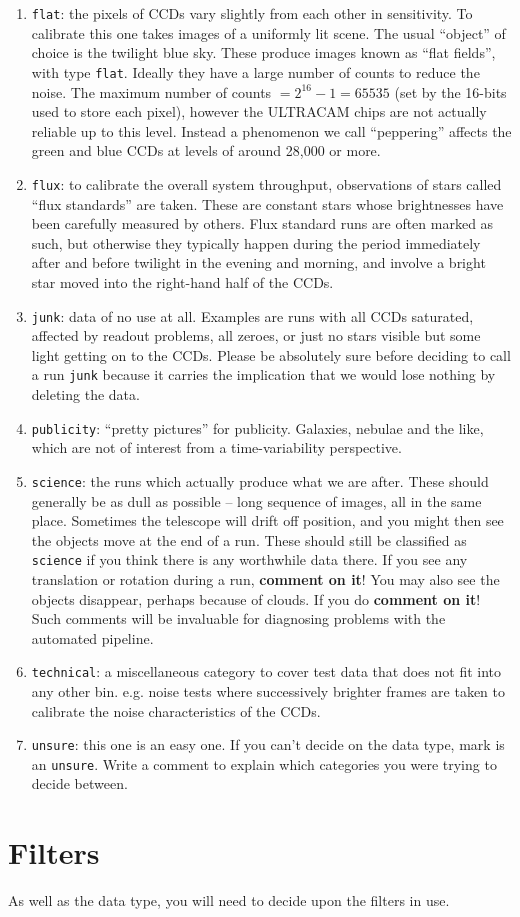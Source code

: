 \documentclass[10pt,a4paper]{article}
\newcommand{\dt}[1]{\texttt{#1}}
\begin{document}
\begin{enumerate}
\item \dt{flat}: the pixels of CCDs vary slightly from each other in
  sensitivity. To calibrate this one takes images of a uniformly lit
  scene. The usual ``object'' of choice is the twilight blue sky. These
  produce images known as ``flat fields'', with type \dt{flat}. Ideally they 
  have a large number of counts to reduce the noise. The maximum number of
  counts $= 2^{16} - 1 = 65535$ (set by the 16-bits used to store each pixel),
  however the ULTRACAM chips are not actually reliable up to this
  level. Instead a phenomenon we call ``peppering'' affects the green and blue
  CCDs at levels of around 28,000 or more. 

\item \dt{flux}: to calibrate the overall system throughput, observations of
  stars called ``flux standards'' are taken. These are constant stars whose
  brightnesses have been carefully measured by others. Flux standard runs are
  often marked as such, but otherwise they typically happen during the period
  immediately after and before twilight in the evening and morning, and
  involve a bright star moved into the right-hand half of the CCDs. 

\item \dt{junk}: data of no use at all. Examples are runs with all CCDs
  saturated, affected by readout problems, all zeroes, or just no stars
  visible but some light getting on to the CCDs. Please be absolutely sure
  before deciding to call a run \dt{junk} because it carries the implication
  that we would lose nothing by deleting the data.

\item \dt{publicity}: ``pretty pictures'' for publicity. Galaxies, nebulae and
  the like, which are not of interest from a time-variability perspective.

\item \dt{science}: the runs which actually produce what we are after. These
  should generally be as dull as possible -- long sequence of images, all in
  the same place. Sometimes the telescope will drift off position, and you
  might then see the objects move at the end of a run. These should still be
  classified as \dt{science} if you think there is any worthwhile data there.
  If you see any translation or rotation during a run, \textbf{comment on it}!
  You may also see the objects disappear, perhaps because of clouds. If you do
  \textbf{comment on it}! Such comments will be invaluable for diagnosing
  problems with the automated pipeline.

\item \dt{technical}: a miscellaneous category to cover test data that does
  not fit into any other bin. e.g. noise tests where successively brighter
  frames are taken to calibrate the noise characteristics of the CCDs.

\item \dt{unsure}: this one is an easy one. If you can't decide on the data
  type, mark is an \dt{unsure}. Write a comment to explain which categories
  you were trying to decide between.

\end{enumerate}


\section{Filters}

As well as the data type, you will need to decide upon the filters in use.
\end{document}
